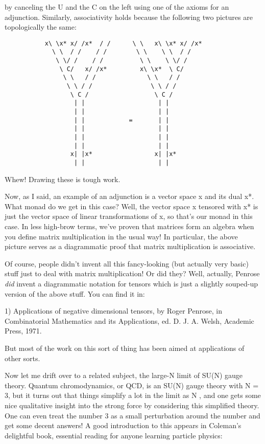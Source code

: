 by canceling the U and the C on the left using one of the
axioms for an adjunction.   Similarly, associativity holds
because the following two pictures are topologically the same:


\begin{verbatim}
           x\ \x* x/ /x*  / /      \ \   x\ \x* x/ /x*
             \ \  / /    / /        \ \    \ \  / /
              \ \/ /    / /          \ \    \ \/ /
               \ C/   x/ /x*         x\ \x*  \ C/
                \ \   / /              \ \   / /
                 \ \ / /                \ \ / /
                  \ C /                  \ C /
                   | |                    | |
                   | |                    | |
                   | |            =       | |
                   | |                    | |
                   | |                    | |
                   | |                    | |
                  x| |x*                 x| |x*
                   | |                    | |

\end{verbatim}
    
Whew!  Drawing these is tough work.  

Now, as I said, an example of an adjunction is a vector space x and
its dual x*.  What monad do we get in this case?  Well, the vector
space x tensored with x* is just the vector space of linear transformations
of x, so that's our monad in this case.  In less high-brow terms,
we've proven that matrices form an algebra when you define matrix
multiplication in the usual way!  In particular, the above picture
serves as a diagrammatic proof that matrix multiplication is associative.

Of course, people didn't invent all this fancy-looking (but actually
very basic) stuff just to deal with matrix multiplication!  Or did
they?  Well, actually, Penrose \emph{did} invent a diagrammatic notation
for tensors which is just a slightly souped-up version of the above
stuff.  You can find it in:

1) Applications of negative dimensional tensors, by Roger Penrose, in 
Combinatorial Mathematics and its Applications, ed. D. J. A. Welsh, 
Academic Press, 1971. 

But most of the work on this sort of thing has been aimed at 
applications of other sorts.  

Now let me drift over to a related subject, the large-N limit of
SU(N) gauge theory.  Quantum chromodynamics, or QCD, is an SU(N) gauge theory
with N = 3, but it turns out that things simplify a lot in the 
limit as N \to  \infty , and one gets some nice qualitative insight into
the strong force by considering this simplified theory.  One can
even treat the number 3 as a small perturbation around the number
\infty  and get some decent answers!   A good introduction to this 
appears in Coleman's delightful book, essential reading for anyone learning
particle physics:

